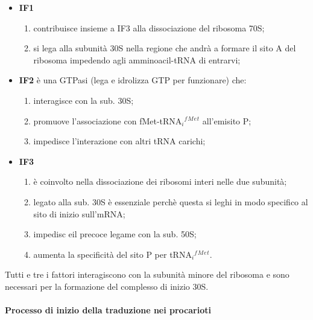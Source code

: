 \documentclass[]{article}
\begin{document}
\begin{itemize}
\itemsep1pt\parskip0pt
\item
  \textbf{IF1}

  \begin{enumerate}
  \def\labelenumi{\arabic{enumi}.}
  \itemsep1pt\parskip0pt
  \item
    contribuisce insieme a IF3 alla dissociazione del ribosoma 70S;
  \item
    si lega alla subunità 30S nella regione che andrà a formare il sito
    A del ribosoma impedendo agli amminoacil-tRNA di entrarvi;
  \end{enumerate}
\item
  \textbf{IF2} è una GTPasi (lega e idrolizza GTP per funzionare) che:

  \begin{enumerate}
  \def\labelenumi{\arabic{enumi}.}
  \itemsep1pt\parskip0pt
  \item
    interagisce con la sub. 30S;
  \item
    promuove l'associazione con fMet-tRNA\(_i\)\(^f\)\(^M\)\(^e\)\(^t\)
    all'emisito P;
  \item
    impedisce l'interazione con altri tRNA carichi;
  \end{enumerate}
\item
  \textbf{IF3}

  \begin{enumerate}
  \def\labelenumi{\arabic{enumi}.}
  \itemsep1pt\parskip0pt
  \item
    è coinvolto nella dissociazione dei ribosomi interi nelle due
    subunità;
  \item
    legato alla sub. 30S è essenziale perchè questa si leghi in modo
    specifico al sito di inizio sull'mRNA;
  \item
    impedisc eil precoce legame con la sub. 50S;
  \item
    aumenta la specificità del sito P per
    tRNA\(_i\)\(^f\)\(^M\)\(^e\)\(^t\).
  \end{enumerate}
\end{itemize}

Tutti e tre i fattori interagiscono con la subunità minore del ribosoma
e sono necessari per la formazione del complesso di inizio 30S.

\paragraph{Processo di inizio della traduzione nei
procarioti}\label{processo-di-inizio-della-traduzione-nei-procarioti}
\end{document}
